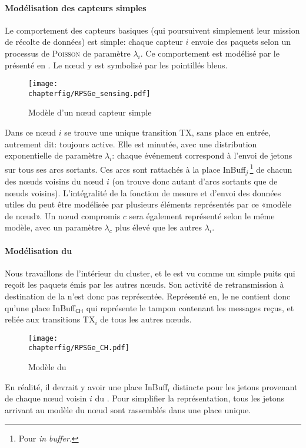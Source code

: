             \paragraph{Modélisation des capteurs simples}
Le comportement des capteurs basiques (qui poursuivent simplement leur mission de récolte de données) est simple: chaque capteur $i$ envoie des paquets selon un processus de \textsc{Poisson} de paramètre $\lambda_i$.
Ce comportement est modélisé par le \rpsg présenté en .
Le nœud y est symbolisé par les pointillés bleus.
\begin{figure}[!ht]
    \centering
    \texttt{[image: \\chapterfig/RPSGe\_sensing.pdf]}
    \caption{Modèle \rpsg d'un nœud capteur simple}\label{sa:fig:snodegspn}
\end{figure}
Dans ce nœud $i$ se trouve une unique transition \textsf{TX}, sans place en entrée, autrement dit: toujours active.
Elle est minutée, avec une distribution exponentielle de paramètre $\lambda_i$: chaque événement correspond à l'envoi de jetons sur tous ses arcs sortants.
Ces arcs sont rattachés à la place \textsf{InBuff$_{j}$}\,\footnote{Pour \textit{in buffer}.} de chacun des nœuds voisins du nœud $i$ (on trouve donc autant d'arcs sortants que de nœuds voisins).
L'intégralité de la fonction de mesure et d'envoi des données utiles du \rc peut être modélisée par plusieurs éléments représentés par ce «modèle de nœud».
Un nœud compromis $c$ sera également représenté selon le même modèle, avec un paramètre $\lambda_c$ plus élevé que les autres $\lambda_i$.

            \paragraph{Modélisation du \ch}
Nous travaillons de l'intérieur du cluster, et le \ch est vu comme un simple puits qui reçoit les paquets émis par les autres nœuds.
Son activité de retransmission à destination de la \sdb n'est donc pas représentée.
Représenté en, le \CH ne contient donc qu'une place \textsf{InBuff$_\textsf{CH}$} qui représente le tampon contenant les messages reçus, et reliée aux transitions \textsf{TX$_i$} de tous les autres nœuds.
\begin{figure}[ht]
    \centering
    \texttt{[image: \\chapterfig/RPSGe\_CH.pdf]}
    \caption{Modèle \rpsg du \ch}\label{sa:fig:chgspn}
\end{figure}
En réalité, il devrait y avoir une place \textsf{InBuff$_i$} distincte pour les jetons provenant de chaque nœud voisin $i$ du \ch. Pour simplifier la représentation, tous les jetons arrivant au modèle du nœud sont rassemblés dans une place unique.

